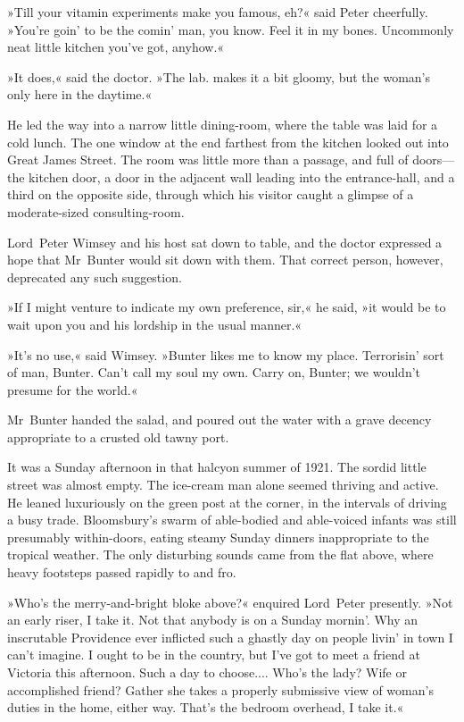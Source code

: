 »Till your vitamin experiments make you famous, eh?« said Peter cheerfully. »You're goin' to be the comin' man, you know. Feel it in my bones. Uncommonly neat little kitchen you've got, anyhow.«

»It does,« said the doctor. »The lab. makes it a bit gloomy, but the woman's only here in the daytime.«

He led the way into a narrow little dining-room, where the table was laid for a cold lunch. The one window at the end farthest from the kitchen looked out into Great James Street. The room was little more than a passage, and full of doors—the kitchen door, a door in the adjacent wall leading into the entrance-hall, and a third on the opposite side, through which his visitor caught a glimpse of a moderate-sized consulting-room.

Lord~Peter Wimsey and his host sat down to table, and the doctor expressed a hope that Mr~Bunter would sit down with them. That correct person, however, deprecated any such suggestion.

»If I might venture to indicate my own preference, sir,« he said, »it would be to wait upon you and his lordship in the usual manner.«

»It's no use,« said Wimsey. »Bunter likes me to know my place. Terrorisin' sort of man, Bunter. Can't call my soul my own. Carry on, Bunter; we wouldn't presume for the world.«

Mr~Bunter handed the salad, and poured out the water with a grave decency appropriate to a crusted old tawny port.

It was a Sunday afternoon in that halcyon summer of 1921. The sordid little street was almost empty. The ice-cream man alone seemed thriving and active. He leaned luxuriously on the green post at the corner, in the intervals of driving a busy trade. Bloomsbury's swarm of able-bodied and able-voiced infants was still presumably within-doors, eating steamy Sunday dinners inappropriate to the tropical weather. The only disturbing sounds came from the flat above, where heavy footsteps passed rapidly to and fro.

»Who's the merry-and-bright bloke above?« enquired Lord~Peter presently. »Not an early riser, I take it. Not that anybody is on a Sunday mornin'. Why an inscrutable Providence ever inflicted such a ghastly day on people livin' in town I can't imagine. I ought to be in the country, but I've got to meet a friend at Victoria this afternoon. Such a day to choose.... Who's the lady? Wife or accomplished friend? Gather she takes a properly submissive view of woman's duties in the home, either way. That's the bedroom overhead, I take it.«

